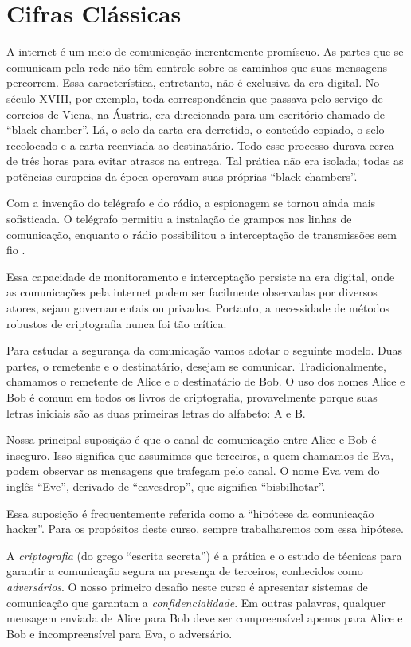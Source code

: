 ﻿\chapter{Cifras Clássicas}
\label{cha:cifras-classicas}

A internet é um meio de comunicação inerentemente promíscuo.
As partes que se comunicam pela rede não têm controle sobre os caminhos que suas mensagens percorrem.
Essa característica, entretanto, não é exclusiva da era digital.
No século XVIII, por exemplo, toda correspondência que passava pelo serviço de correios de Viena, na Áustria, era direcionada para um escritório chamado de ``black chamber''.
Lá, o selo da carta era derretido, o conteúdo copiado, o selo recolocado e a carta reenviada ao destinatário.
Todo esse processo durava cerca de três horas para evitar atrasos na entrega.
Tal prática não era isolada; todas as potências europeias da época operavam suas próprias ``black chambers''.

Com a invenção do telégrafo e do rádio, a espionagem se tornou ainda mais sofisticada.
O telégrafo permitiu a instalação de grampos nas linhas de comunicação, enquanto o rádio possibilitou a interceptação de transmissões sem fio \cite{Kahn96}.

Essa capacidade de monitoramento e interceptação persiste na era digital, onde as comunicações pela internet podem ser facilmente observadas por diversos atores, sejam governamentais ou privados.
Portanto, a necessidade de métodos robustos de criptografia nunca foi tão crítica.

Para estudar a segurança da comunicação vamos adotar o seguinte modelo.
Duas partes, o remetente e o destinatário, desejam se comunicar.
Tradicionalmente, chamamos o remetente de Alice e o destinatário de Bob.
O uso dos nomes Alice e Bob é comum em todos os livros de criptografia, provavelmente porque suas letras iniciais são as duas primeiras letras do alfabeto: A e B.

Nossa principal suposição é que o canal de comunicação entre Alice e Bob é inseguro.
Isso significa que assumimos que terceiros, a quem chamamos de Eva, podem observar as mensagens que trafegam pelo canal.
O nome Eva vem do inglês ``Eve'', derivado de ``eavesdrop'', que significa ``bisbilhotar''.

Essa suposição é frequentemente referida como a ``hipótese da comunicação hacker''.
Para os propósitos deste curso, sempre trabalharemos com essa hipótese.

A {\em criptografia} (do grego ``escrita secreta'') é a prática e o estudo de técnicas para garantir a comunicação segura na presença de terceiros, conhecidos como {\em adversários}.
O nosso primeiro desafio neste curso é apresentar sistemas de comunicação que garantam a {\em confidencialidade}.
Em outras palavras, qualquer mensagem enviada de Alice para Bob deve ser compreensível apenas para Alice e Bob e incompreensível para Eva, o adversário.


